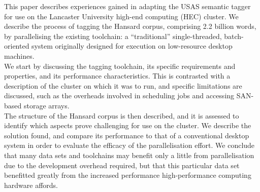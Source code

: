     This paper describes experiences gained in adapting the USAS semantic tagger for use on the Lancaster University high-end computing (HEC) cluster.  We describe the process of tagging the Hansard corpus, comprising 2.2 billion words, by parallelising the existing toolchain: a ``traditional'' single-threaded, batch-oriented system originally designed for execution on low-resource desktop machines.\\
    We start by discussing the tagging toolchain, its specific requirements and properties, and its performance characteristics.  This is contrasted with a description of the cluster on which it was to run, and specific limitations are discussed, such as the overheads involved in scheduling jobs and accessing SAN-based storage arrays.\\
    The structure of the Hansard corpus is then described, and it is assessed to identify which aspects prove challenging for use on the cluster.  We describe the solution found, and compare its performance to that of a conventional desktop system in order to evaluate the efficacy of the parallelisation effort.
    We conclude that many data sets and toolchains may benefit only a little from parallelisation due to the development overhead required, but that this particular data set benefitted greatly from the increased performance high-performance computing hardware affords.


    
